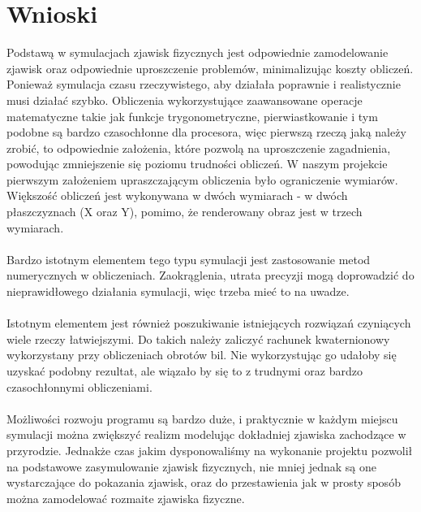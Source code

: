 \section{Wnioski}

Podstawą w symulacjach zjawisk fizycznych jest odpowiednie zamodelowanie zjawisk oraz odpowiednie uproszczenie problemów, minimalizując koszty obliczeń. Ponieważ symulacja czasu rzeczywistego, aby działała poprawnie i realistycznie musi działać szybko. Obliczenia wykorzystujące zaawansowane operacje matematyczne takie jak funkcje trygonometryczne, pierwiastkowanie i tym podobne są bardzo czasochłonne dla procesora, więc pierwszą rzeczą jaką należy zrobić, to odpowiednie założenia, które pozwolą na uproszczenie zagadnienia, powodując zmniejszenie się poziomu trudności obliczeń. W naszym projekcie pierwszym założeniem upraszczającym obliczenia było ograniczenie wymiarów. Większość obliczeń jest wykonywana w dwóch wymiarach - w dwóch płaszczyznach (X oraz Y), pomimo, że renderowany obraz jest w trzech wymiarach. \\ \\

Bardzo istotnym elementem tego typu symulacji jest zastosowanie metod numerycznych w obliczeniach. Zaokrąglenia, utrata precyzji mogą doprowadzić do nieprawidłowego działania symulacji, więc trzeba mieć to na uwadze. \\ \\

Istotnym elementem jest również poszukiwanie istniejących rozwiązań czyniących wiele rzeczy łatwiejszymi. Do takich należy zaliczyć rachunek kwaternionowy wykorzystany przy obliczeniach obrotów bil. Nie wykorzystując go udałoby się uzyskać podobny rezultat, ale wiązało by się to z trudnymi oraz bardzo czasochłonnymi obliczeniami. \\ \\

Możliwości rozwoju programu są bardzo duże, i praktycznie w każdym miejscu symulacji można zwiększyć realizm modelując dokładniej zjawiska zachodzące w przyrodzie. Jednakże czas jakim dysponowaliśmy na wykonanie projektu pozwolił na podstawowe zasymulowanie zjawisk fizycznych, nie mniej jednak są one wystarczające do pokazania zjawisk, oraz do przestawienia jak w prosty sposób można zamodelować rozmaite zjawiska fizyczne.